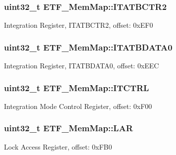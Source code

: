 \subsubsection[{I\+T\+A\+T\+B\+C\+T\+R2}]{\setlength{\rightskip}{0pt plus 5cm}uint32\+\_\+t E\+T\+F\+\_\+\+Mem\+Map\+::\+I\+T\+A\+T\+B\+C\+T\+R2}\label{struct_e_t_f___mem_map_ab6920fa131f508ff5a9b6817be95bed5}
Integration Register, I\+T\+A\+T\+B\+C\+T\+R2, offset\+: 0x\+E\+F0 \hypertarget{struct_e_t_f___mem_map_ab9991b5782efe3ff465d49f40ed0bbfa}{}
\subsubsection[{I\+T\+A\+T\+B\+D\+A\+T\+A0}]{\setlength{\rightskip}{0pt plus 5cm}uint32\+\_\+t E\+T\+F\+\_\+\+Mem\+Map\+::\+I\+T\+A\+T\+B\+D\+A\+T\+A0}\label{struct_e_t_f___mem_map_ab9991b5782efe3ff465d49f40ed0bbfa}
Integration Register, I\+T\+A\+T\+B\+D\+A\+T\+A0, offset\+: 0x\+E\+E\+C \hypertarget{struct_e_t_f___mem_map_a287d5070161434a42360e126bd310a1a}{}
\subsubsection[{I\+T\+C\+T\+R\+L}]{\setlength{\rightskip}{0pt plus 5cm}uint32\+\_\+t E\+T\+F\+\_\+\+Mem\+Map\+::\+I\+T\+C\+T\+R\+L}\label{struct_e_t_f___mem_map_a287d5070161434a42360e126bd310a1a}
Integration Mode Control Register, offset\+: 0x\+F00 \hypertarget{struct_e_t_f___mem_map_ac5caea67f9fed40ab8f183954f6401a8}{}
\subsubsection[{L\+A\+R}]{\setlength{\rightskip}{0pt plus 5cm}uint32\+\_\+t E\+T\+F\+\_\+\+Mem\+Map\+::\+L\+A\+R}\label{struct_e_t_f___mem_map_ac5caea67f9fed40ab8f183954f6401a8}
Lock Access Register, offset\+: 0x\+F\+B0 \hypertarget{struct_e_t_f___mem_map_a404d7b7ce01537cb61bbb7c2d2ec1de5}{}
